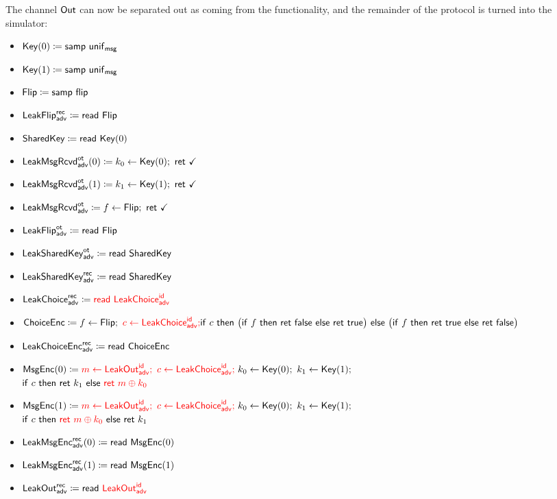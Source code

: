 \noindent The channel $\mathsf{Out}$ can now be separated out as coming from the functionality, and the remainder of the protocol is turned into the simulator: 

\begin{itemize}
\item $\mathsf{Key}(0) \coloneqq \mathsf{samp} \ \mathsf{unif}_{\mathsf{msg}}$
\item $\mathsf{Key}(1) \coloneqq \mathsf{samp} \ \mathsf{unif}_{\mathsf{msg}}$
\item $\mathsf{Flip} \coloneqq \mathsf{samp} \ \mathsf{flip}$
\item {\color{blue} $\mathsf{LeakFlip}^{\mathsf{rec}}_{\mathsf{adv}} \coloneqq \mathsf{read} \ \mathsf{Flip}$}
\item $\mathsf{SharedKey} \coloneqq \mathsf{read} \ \mathsf{Key}(0)$
\item {\color{blue} $\LeakKeyRcvd^\ot_\adv(0) \coloneqq k_0 \leftarrow \Key(0); \ \ret{\checkmark}$}
\item {\color{blue} $\LeakKeyRcvd^\ot_\adv(1) \coloneqq k_1 \leftarrow \Key(1); \ \ret{\checkmark}$}
\item {\color{blue} $\mathsf{LeakMsgRcvd}^{\mathsf{ot}}_{\mathsf{adv}} \coloneqq f \leftarrow \mathsf{Flip}; \ \mathsf{ret} \ \checkmark$}
\item {\color{blue} $\mathsf{LeakFlip}^{\mathsf{ot}}_{\mathsf{adv}} \coloneqq \mathsf{read} \ \mathsf{Flip}$}
\item {\color{blue} $\mathsf{LeakSharedKey}^{\mathsf{ot}}_{\mathsf{adv}} \coloneqq \mathsf{read} \ \mathsf{SharedKey}$}
\item {\color{blue} $\mathsf{LeakSharedKey}^{\mathsf{rec}}_{\mathsf{adv}} \coloneqq \mathsf{read} \ \mathsf{SharedKey}$}
\item {\color{blue} $\mathsf{LeakChoice}^{\mathsf{rec}}_{\mathsf{adv}} \coloneqq {\color{red} \mathsf{read} \ \mathsf{LeakChoice}^{\mathsf{id}}_{\mathsf{adv}}}$}
\item $\mathsf{ChoiceEnc} \coloneqq f \leftarrow \mathsf{Flip}; \ {\color{red} c \leftarrow \mathsf{LeakChoice}^{\mathsf{id}}_{\mathsf{adv}};} \\ \mathsf{if} \ c \ \mathsf{then} \ \big(\mathsf{if} \ f \ \mathsf{then} \ \mathsf{ret} \ \mathsf{false} \ \mathsf{else} \ \mathsf{ret} \ \mathsf{true}\big) \ \mathsf{else} \ \big(\mathsf{if} \ f \ \mathsf{then} \ \mathsf{ret} \ \mathsf{true} \ \mathsf{else} \ \mathsf{ret} \ \mathsf{false}\big)$
\item {\color{blue} $\mathsf{LeakChoiceEnc}^{\mathsf{rec}}_{\mathsf{adv}} \coloneqq \mathsf{read} \ \mathsf{ChoiceEnc}$}
\item $\MsgEnc(0) \coloneqq {\color{red} m \leftarrow \LeakOut^\id_\adv; \ c \leftarrow \LeakChoice^\id_\adv;} \ k_0 \leftarrow \Key(0); \ k_1 \leftarrow \Key(1);$ \\ $\mathsf{if} \ c \ \mathsf{then} \ \mathsf{ret} \ k_1 \ \mathsf{else} \ {\color{red} \mathsf{ret} \ m \oplus k_0}$
\item $\MsgEnc(1) \coloneqq {\color{red} m \leftarrow \LeakOut^\id_\adv; \ c \leftarrow \LeakChoice^\id_\adv;} \ k_0 \leftarrow \Key(0); \ k_1 \leftarrow \Key(1);$ \\ $\mathsf{if} \ c \ \mathsf{then} \ {\color{red} \mathsf{ret} \ m \oplus k_0} \ \mathsf{else} \ \mathsf{ret} \ k_1$
\item {\color{blue} $\mathsf{LeakMsgEnc}^{\mathsf{rec}}_{\mathsf{adv}}(0) \coloneqq \mathsf{read} \ \mathsf{MsgEnc}(0)$}
\item {\color{blue} $\mathsf{LeakMsgEnc}^{\mathsf{rec}}_{\mathsf{adv}}(1) \coloneqq \mathsf{read} \ \mathsf{MsgEnc}(1)$}
\item {\color{blue} $\mathsf{LeakOut}^{\mathsf{rec}}_{\mathsf{adv}} \coloneqq \mathsf{read} \ {\color{red} \mathsf{LeakOut}^{\mathsf{id}}_{\mathsf{adv}}}$}
\end{itemize}

